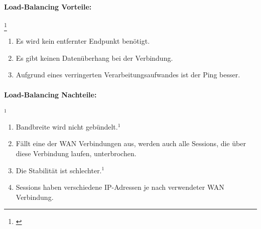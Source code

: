 \paragraph{Load-Balancing Vorteile:}\footnote[1]{\cite[Vgl.][]{MWAN3}}
\begin{enumerate}
    \item Es wird kein entfernter Endpunkt benötigt.
    \item Es gibt keinen Datenüberhang bei der Verbindung.
    \item Aufgrund eines verringerten Verarbeitungsaufwandes ist der Ping besser. 
\end{enumerate}
\paragraph{Load-Balancing Nachteile:}$^{1}$
\begin{enumerate}
    \item Bandbreite wird nicht gebündelt.$^{1}$
    \item Fällt eine der WAN Verbindungen aus, werden auch alle Sessions, die über diese Verbindung laufen, unterbrochen.
    \item Die Stabilität ist schlechter.$^{1}$
    \item Sessions haben verschiedene IP-Adressen je nach verwendeter WAN Verbindung.
\end{enumerate}


